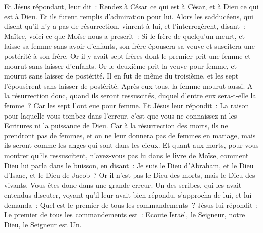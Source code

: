\begin{multicols}{2}
Et Jésus répondant, leur dit~: Rendez à César ce qui est à César, et à Dieu ce qui est à Dieu. Et ils furent remplis d'admiration pour lui.
Alors les sadducéens, qui disent qu'il n'y a pas de résurrection, vinrent à lui, et l'interrogèrent, disant~:
Maître, voici ce que Moïse nous a prescrit~: Si le frère de quelqu'un meurt, et laisse sa femme sans avoir d'enfants, son frère épousera sa veuve et suscitera une postérité à son frère.
Or il y avait sept frères dont le premier prit une femme et mourut sans laisser d'enfants.
Or le deuxième prit la veuve pour femme, et mourut sans laisser de postérité. Il en fut de même du troisième,
et les sept l'épousèrent sans laisser de postérité. Après eux tous, la femme mourut aussi.
A la résurrection donc, quand ils seront ressuscités, duquel d'entre eux sera-t-elle la femme~? Car les sept l'ont eue pour femme.
Et Jésus leur répondit~: La raison pour laquelle vous tombez dans l'erreur, c'est que vous ne connaissez ni les Ecritures ni la puissance de Dieu.
Car à la résurrection des morts, ils ne prendront pas de femmes, et on ne leur donnera pas de femmes en mariage, mais ils seront comme les anges qui sont dans les cieux.
Et quant aux morts, pour vous montrer qu'ils ressuscitent, n'avez-vous pas lu dans le livre de Moïse, comment Dieu lui parla dans le buisson, en disant~: Je suis le Dieu d'Abraham, et le Dieu d'Isaac, et le Dieu de Jacob~?
Or il n'est pas le Dieu des morts, mais le Dieu des vivants. Vous êtes donc dans une grande erreur.
Un des scribes, qui les avait entendus discuter, voyant qu'il leur avait bien répondu, s'approcha de lui, et lui demanda~: Quel est le premier de tous les commandements~?
Jésus lui répondit~: Le premier de tous les commandements est~: Ecoute Israël, le Seigneur, notre Dieu, le Seigneur est Un.

\end{multicols}
